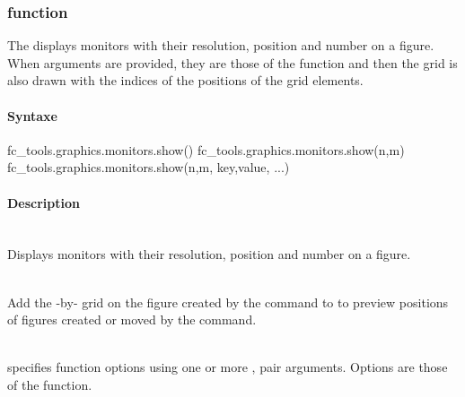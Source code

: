 \begin{center}
\end{center}


\subsubsection[fc\_tools.graphics.monitors.show function]{ function}
The  displays monitors with their resolution, position and number on a figure. 
When arguments are provided, they are those of the 
function and then the grid is also drawn with the indices of the positions of the grid elements. 
\paragraph{Syntaxe}
\begin{syntaxe}
fc_tools.graphics.monitors.show()
fc_tools.graphics.monitors.show(n,m)
fc_tools.graphics.monitors.show(n,m, key,value, ...)
\end{syntaxe}

\paragraph{Description}
\begin{description}
\item {}\\
Displays monitors with their resolution, position and number on a figure.
%
\item {}\\
Add the -by- grid on the figure created by the  command to
to preview positions of figures created or moved by the  command.
\item {}\\
specifies function options using one or more , pair 
arguments. Options are those of the  function.
\end{description}

